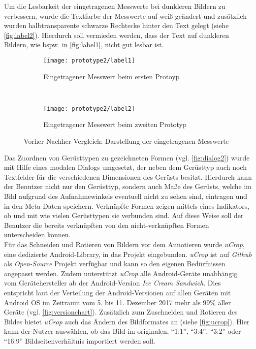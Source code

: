 Um die Lesbarkeit der eingetragenen Messwerte bei dunkleren Bildern zu verbessern, wurde die Textfarbe der Messwerte auf weiß geändert und zusätzlich wurden halbtransparente schwarze Rechtecke hinter den Text gelegt (siehe \autoref{fig:label2}).
Hierdurch soll vermieden werden, dass der Text auf dunkleren Bildern, wie bspw. in \autoref{fig:label1}, nicht gut lesbar ist.
\begin{figure}[h]
  \begin{subfigure}[t]{0.4\textwidth}
    \centering
    \texttt{[image: prototype2/label1]}
    \caption{Eingetragener Messwert beim ersten Protoyp}
    \label{fig:label1}
  \end{subfigure}
  ~
  \begin{subfigure}[t]{0.4\textwidth}
    \centering
    \texttt{[image: prototype2/label2]}
    \caption{Eingetragener Messwert beim zweiten Prototyp}
    \label{fig:label2}
  \end{subfigure}
  \centering
  \caption{Vorher-Nachher-Vergleich: Darstellung der eingetragenen Messwerte}
  \label{fig:labels}
\end{figure}

Das Zuordnen von Gerüsttypen zu gezeichneten Formen (vgl. \autoref{fig:dialog2}) wurde mit Hilfe eines modalen Dialogs umgesetzt, der neben dem Gerüsttyp auch noch Textfelder für die verschiedenen Dimensionen des Gerüsts besitzt.
Hierdurch kann der Benutzer nicht nur den Gerüsttyp, sondern auch Maße des Gerüsts, welche im Bild aufgrund des Aufnahmewinkels eventuell nicht zu sehen sind, eintragen und in den Meta-Daten speichern.
Verknüpfte Formen zeigen mittels eines Indikators, ob und mit wie vielen Gerüsttypen sie verbunden sind.
Auf diese Weise soll der Benutzer die bereits verknüpften von den nicht-verknüpften Formen unterscheiden können. \\

Für das Schneiden und Rotieren von Bildern vor dem Annotieren wurde \emph{uCrop}, eine dedizierte Android-Library, in das Projekt eingebunden.
\emph{uCrop} ist auf \emph{Github} als \emph{Open-Source} Projekt verfügbar und kann so den eigenen Bedürfnissen angepasst werden. 
Zudem unterstützt \emph{uCrop} alle Android-Geräte unabhängig vom Gerätehersteller ab der Android-Version \emph{Ice Cream Sandwich}. 
Dies entspricht laut der Verteilung der Android-Versionen auf allen Geräten mit Android OS im Zeitraum vom 5. bis 11. Dezember 2017 mehr als $99\%$ aller Geräte (vgl. \autoref{fig:versionchart}).
Zusätzlich zum Zuschneiden und Rotieren des Bildes bietet \emph{uCrop} auch das Ändern des Bildformates an (siehe \autoref{fig:ucrop}).
Hier kann der Nutzer auswählen, ob das Bild im originalen, ``1:1'', ``3:4'', ``3:2'' oder ``16:9'' Bildseitenverhältnis importiert werden soll.

